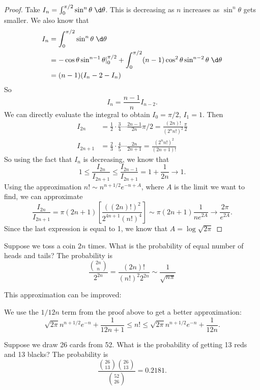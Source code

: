 \documentclass[a4paper]{article}
\begin{document}
\begin{proof}
  Take $I_n = \int_0^{\pi/2} \sin^n\theta\;\d \theta$. This is decreasing as $n$ increases as $\sin^n\theta$ gets smaller. We also know that
  \begin{align*}
    I_n &= \int_0^{\pi/2}\sin^n \theta\;\d \theta\\
    &= -\cos\theta\sin^{n - 1}\theta |_0^{\pi/2} + \int_0^{\pi/2} (n - 1)\cos^2\theta \sin^{n - 2}\theta \;\d\theta\\
    &= (n - 1)(I_n - 2 - I_n)
  \end{align*}
  So
  \[
    I_n = \frac{n - 1}{n}I_{n - 2}.
  \]
  We can directly evaluate the integral to obtain $I_0 = \pi/2$, $I_1 = 1$. Then
  \begin{align*}
    I_{2n} &= \frac{1}{2}\cdot\frac{3}{4}\cdots \frac{2n - 1}{2n} \pi/2 = \frac{(2n)!}{(2^nn!)^2}\frac{\pi}{2}\\
    I_{2n + 1} &= \frac{2}{3}\cdot\frac{4}{5}\cdots\frac{2n}{2n + 1} = \frac{(2^nn!)^2}{(2n + 1)!}
  \end{align*}
  So using the fact that $I_n$ is decreasing, we know that
  \[
    1 \leq \frac{I_{2n}}{I_{2n + 1}} \leq \frac{I_{2n - 1}}{I_{2n + 1}} = 1 + \frac{1}{2n} \to 1.
  \]
  Using the approximation $n!\sim n^{n + 1/2}e^{-n + A}$, where $A$ is the limit we want to find, we can approximate
  \[
    \frac{I_{2n}}{I_{2n + 1}} = \pi(2n + 1)\left[\frac{( (2n)!)^2}{2^{4n + 1}(n!)^4}\right] \sim \pi(2n + 1)\frac{1}{ne^{2A}}\to \frac{2\pi}{e^{2A}}.
  \]
  Since the last expression is equal to 1, we know that $A = \log\sqrt{2\pi}$
\end{proof}

\begin{eg}
  Suppose we toss a coin $2n$ times. What is the probability of equal number of heads and tails? The probability is
  \[
    \frac{\binom{2n}{n}}{2^{2n}} = \frac{(2n)!}{(n!)^2 2^{2n}} \sim \frac{1}{\sqrt{n\pi}}
  \]
\end{eg}

This approximation can be improved:
\begin{prop}
  We use the $1/12n$ term from the proof above to get a better approximation:
  \[
    \sqrt{2\pi}n^{n + 1/2}e^{-n} + \frac{1}{12n + 1} \leq n! \leq \sqrt{2\pi} n^{n + 1/2} e^{-n} + \frac{1}{12n}.
  \]
\end{prop}

\begin{eg}
  Suppose we draw 26 cards from 52. What is the probability of getting 13 reds and 13 blacks? The probability is
  \[
    \frac{\binom{26}{13}\binom{26}{13}}{\binom{52}{26}} = 0.2181.
  \]
\end{eg}
\end{document}

